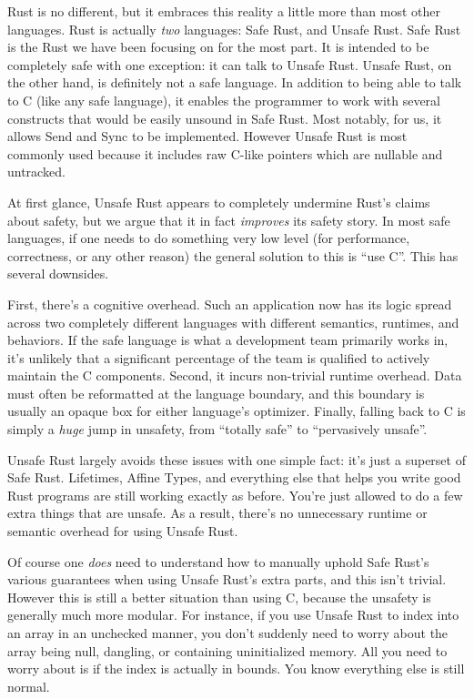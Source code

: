 Rust is no different, but it embraces this reality a little more than most
other languages. Rust is actually \emph{two} languages: Safe Rust, and Unsafe Rust.
Safe Rust is the Rust we have been focusing on for the most part. It
is intended to be completely safe with one exception: it can talk to
Unsafe Rust. Unsafe Rust, on the other hand, is definitely not a safe language.
In addition to being able to talk to C (like any safe language), it enables the
programmer to work with several constructs that would be easily unsound in
Safe Rust. Most notably, for us, it allows Send and Sync to be implemented.
However Unsafe Rust is most commonly used because it includes raw C-like pointers
which are nullable and untracked.

At first glance, Unsafe Rust appears to completely undermine Rust's claims about
safety, but we argue that it in fact \emph{improves} its safety story. In most safe
languages, if one needs to do something very low level (for performance, correctness,
or any other reason) the general solution to this is ``use C''. This has several
downsides.

First, there's a cognitive overhead. Such an application now has
its logic spread across two completely different languages with different
semantics, runtimes, and behaviors. If the safe language is what a development
team primarily works in, it's unlikely that a significant percentage of the team
is qualified to actively maintain the C components. Second, it incurs non-trivial
runtime overhead. Data must often be reformatted at the language boundary, and
this boundary is usually an opaque box for either language's optimizer.
Finally, falling back to C is simply a \emph{huge} jump in unsafety, from ``totally
safe'' to ``pervasively unsafe''.

Unsafe Rust largely avoids these issues with one simple fact:
it's just a superset of Safe Rust. Lifetimes, Affine Types, and everything else
that helps you write good Rust programs are still working exactly as before.
You're just allowed to do a few extra things that are unsafe. As a result,
there's no unnecessary runtime or semantic overhead for using Unsafe Rust.

Of course one \emph{does} need to understand how to manually uphold Safe Rust's
various guarantees when using Unsafe Rust's extra parts, and this isn't trivial.
However this is still a better situation than using C, because the unsafety is
generally much more modular. For instance, if you use Unsafe Rust to index into
an array in an unchecked manner, you don't suddenly need to worry about the
array being null, dangling, or containing uninitialized memory. All you need to
worry about is if the index is actually in bounds. You know everything else is
still normal.

